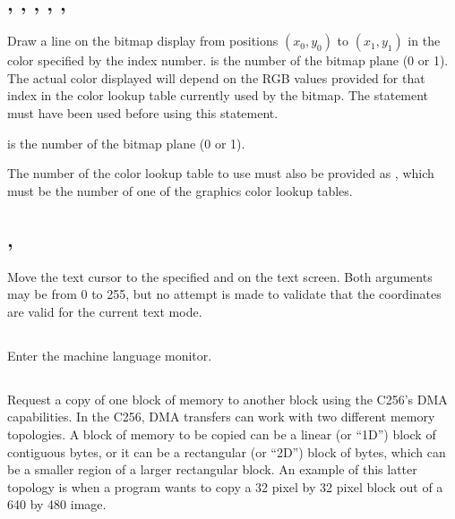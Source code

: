 \documentclass{report}
\begin{document}
    \subsection*{ , , , , , }

    Draw a line on the bitmap display from positions $(x_0, y_0)$ to $(x_1, y_1)$ in the color
    specified by the  index number.
     is the number of the bitmap plane (0 or 1).
    The actual color displayed will depend on the RGB values provided for
    that index in the color lookup table currently used by the bitmap.
    The  statement must have been used before using
    this statement.

     is the number of the bitmap plane (0 or 1).

    The number of the color lookup table to use must also be provided as ,
    which must be the number of one of the graphics color lookup tables.

    \subsection*{ , }

    Move the text cursor to the specified  and  on the text screen.
    Both arguments may be from 0 to 255, but no attempt is made to validate that the coordinates are
    valid for the current text mode.

    \subsection*{}

    Enter the machine language monitor.

    \subsection*{   }

    Request a copy of one block of memory to another block using the C256's DMA capabilities.
    In the C256, DMA transfers can work with two different memory topologies.
    A block of memory to be copied can be a linear (or ``1D'') block of contiguous bytes, or
    it can be a rectangular (or ``2D'') block of bytes, which can be a smaller region of a
    larger rectangular block. An example of this latter topology is when a program wants to
    copy a 32 pixel by 32 pixel block out of a 640 by 480 image.
\end{document}
